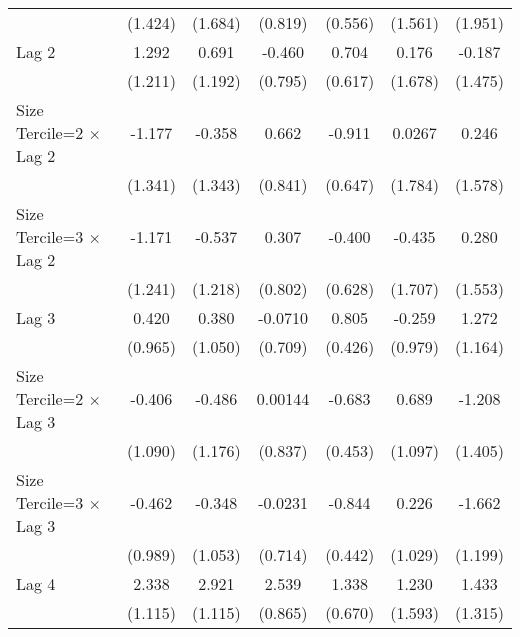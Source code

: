 \begin{table}[htbp]
\begin{tabular}{l*{6}{c}}
                &  (1.424)         &  (1.684)         &  (0.819)         &  (0.556)         &  (1.561)         &  (1.951)         \\
\addlinespace
Lag 2           &    1.292         &    0.691         &   -0.460         &    0.704         &    0.176         &   -0.187         \\
                &  (1.211)         &  (1.192)         &  (0.795)         &  (0.617)         &  (1.678)         &  (1.475)         \\
\addlinespace
Size Tercile=2 $\times$ Lag 2&   -1.177         &   -0.358         &    0.662         &   -0.911         &   0.0267         &    0.246         \\
                &  (1.341)         &  (1.343)         &  (0.841)         &  (0.647)         &  (1.784)         &  (1.578)         \\
\addlinespace
Size Tercile=3 $\times$ Lag 2&   -1.171         &   -0.537         &    0.307         &   -0.400         &   -0.435         &    0.280         \\
                &  (1.241)         &  (1.218)         &  (0.802)         &  (0.628)         &  (1.707)         &  (1.553)         \\
\addlinespace
Lag 3           &    0.420         &    0.380         &  -0.0710         &    0.805         &   -0.259         &    1.272         \\
                &  (0.965)         &  (1.050)         &  (0.709)         &  (0.426)         &  (0.979)         &  (1.164)         \\
\addlinespace
Size Tercile=2 $\times$ Lag 3&   -0.406         &   -0.486         &  0.00144         &   -0.683         &    0.689         &   -1.208         \\
                &  (1.090)         &  (1.176)         &  (0.837)         &  (0.453)         &  (1.097)         &  (1.405)         \\
\addlinespace
Size Tercile=3 $\times$ Lag 3&   -0.462         &   -0.348         &  -0.0231         &   -0.844         &    0.226         &   -1.662         \\
                &  (0.989)         &  (1.053)         &  (0.714)         &  (0.442)         &  (1.029)         &  (1.199)         \\
\addlinespace
Lag 4           &    2.338\sym{*}  &    2.921\sym{**} &    2.539\sym{**} &    1.338\sym{*}  &    1.230         &    1.433         \\
                &  (1.115)         &  (1.115)         &  (0.865)         &  (0.670)         &  (1.593)         &  (1.315)         \\

\end{tabular}
\end{table}
